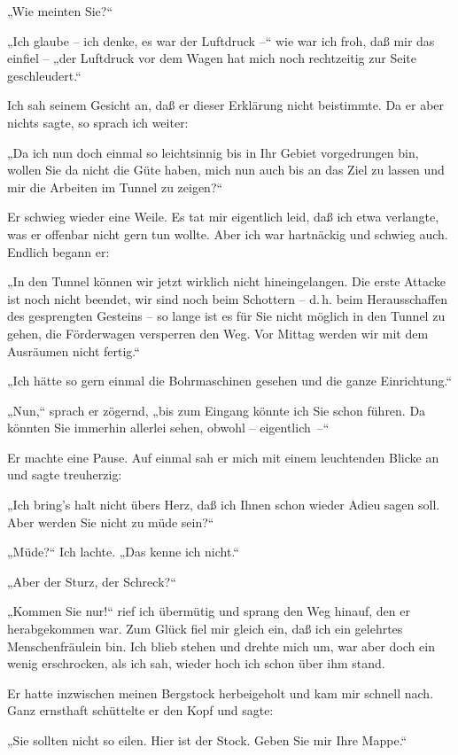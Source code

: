 „Wie meinten Sie?“

„Ich glaube – ich denke, es war der Luftdruck –“ wie war ich froh,
daß mir das einfiel – „der Luftdruck vor dem Wagen hat mich noch
rechtzeitig zur Seite geschleudert.“

Ich sah seinem Gesicht an, daß er dieser Erklärung nicht
beistimmte. Da er aber nichts sagte, so sprach ich weiter:

„Da ich nun doch einmal so leichtsinnig bis in Ihr Gebiet
vorgedrungen bin, wollen Sie da nicht die Güte haben, mich nun auch
bis an das Ziel zu lassen und mir die Arbeiten im Tunnel zu
zeigen?“

Er schwieg wieder eine Weile. Es tat mir eigentlich leid, daß ich
etwa verlangte, was er offenbar nicht gern tun wollte. Aber ich war
hartnäckig und schwieg auch. Endlich begann er:

„In den Tunnel können wir jetzt wirklich nicht hineingelangen. Die
erste Attacke ist noch nicht beendet, wir sind noch beim Schottern
– d.\,h. beim Herausschaffen des gesprengten Gesteins – so lange ist
es für Sie nicht möglich in den Tunnel zu gehen, die Förderwagen
versperren den Weg. Vor Mittag werden wir mit dem Ausräumen nicht
fertig.“

„Ich hätte so gern einmal die Bohrmaschinen gesehen und die ganze
Einrichtung.“

„Nun,“ sprach er zögernd, „bis zum Eingang könnte ich Sie schon
führen. Da könnten Sie immerhin allerlei sehen, obwohl –
eigentlich~–“

Er machte eine Pause. Auf einmal sah er mich mit einem leuchtenden
Blicke an und sagte treuherzig:

„Ich bring's halt nicht übers Herz, daß ich Ihnen schon wieder
Adieu sagen soll. Aber werden Sie nicht zu müde sein?“

„Müde?“ Ich lachte. „Das kenne ich nicht.“

„Aber der Sturz, der Schreck?“

„Kommen Sie nur!“ rief ich übermütig und sprang den Weg hinauf, den
er herabgekommen war. Zum Glück fiel mir gleich ein, daß ich ein
gelehrtes Menschenfräulein bin. Ich blieb stehen und drehte mich
um, war aber doch ein wenig erschrocken, als ich sah, wieder hoch
ich schon über ihm stand.

Er hatte inzwischen meinen Bergstock herbeigeholt und kam mir
schnell nach. Ganz ernsthaft schüttelte er den Kopf und sagte:

„Sie sollten nicht so eilen. Hier ist der Stock. Geben Sie mir Ihre
Mappe.“

